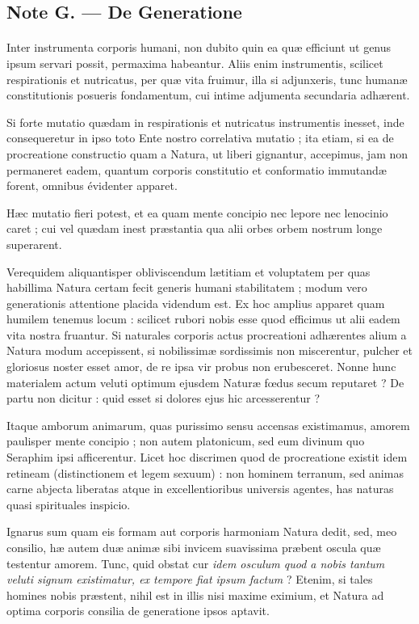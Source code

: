 \documentclass[a4paper, 11pt, oneside, landscape]{article}
\begin{document}
\subsection{Note G. --- De Generatione}
\paragraph{}
Inter instrumenta corporis humani, non dubito quin ea quæ efficiunt ut genus ipsum servari possit, permaxima habeantur. Aliis enim instrumentis, scilicet respirationis et nutricatus, per quæ vita fruimur, illa si adjunxeris, tunc humanæ constitutionis posueris fondamentum, cui intime adjumenta secundaria adhærent.

Si forte mutatio quædam in respirationis et nutricatus instrumentis inesset, inde consequeretur in ipso toto Ente nostro correlativa mutatio ; ita etiam, si ea de procreatione constructio quam a Natura, ut liberi gignantur, accepimus, jam non permaneret eadem, quantum corporis constitutio et conformatio immutandæ forent, omnibus évidenter apparet.

Hæc mutatio fieri potest, et ea quam mente concipio nec lepore nec lenocinio caret ; cui vel quædam inest præstantia qua alii orbes orbem nostrum longe superarent.

Verequidem aliquantisper obliviscendum lætitiam et voluptatem per quas habillima Natura certam fecit generis humani stabilitatem ; modum vero generationis attentione placida videndum est. Ex hoc amplius apparet quam humilem tenemus locum : scilicet rubori nobis esse quod efficimus ut alii eadem vita nostra fruantur. Si naturales corporis actus procreationi adhærentes alium a Natura modum accepissent, si nobilissimæ sordissimis non miscerentur, pulcher et gloriosus noster esset amor, de re ipsa vir probus non erubesceret. Nonne hunc materialem actum veluti optimum ejusdem Naturæ fœdus secum reputaret ? De partu non dicitur : quid esset si dolores ejus hic arcesserentur ?

Itaque amborum animarum, quas purissimo sensu accensas existimamus, amorem paulisper mente concipio ; non autem platonicum, sed eum divinum quo Seraphim ipsi afficerentur. Licet hoc discrimen quod de procreatione existit idem retineam (distinctionem et legem sexuum) : non hominem terranum, sed animas carne abjecta liberatas atque in excellentioribus universis agentes, has naturas quasi spirituales inspicio.

Ignarus sum quam eis formam aut corporis harmoniam Natura dedit, sed, meo consilio, hæ autem duæ animæ sibi invicem suavissima præbent oscula quæ testentur amorem. Tunc, quid obstat cur \emph{idem osculum quod a nobis tantum veluti signum existimatur, ex tempore fiat ipsum factum} ? Etenim, si tales homines nobis præstent, nihil est in illis nisi maxime eximium, et Natura ad optima corporis consilia de generatione ipsos aptavit.
\end{document}
